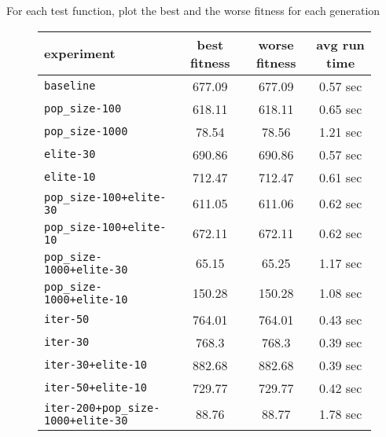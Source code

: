 For each test function, plot the best and the worse fitness for each generation

\begin{figure}[htb]
	\centering
	
	\begin{tabular}{lccc}
		\toprule
		\textbf{experiment} & \textbf{best fitness} & \textbf{worse fitness} & \textbf{avg run time} \\
		\midrule
		\texttt{baseline 						}	&  677.09 &                677.09 &                 0.57 sec \\
		\texttt{pop\_size-100 					}	&   618.11 &                618.11 &                 0.65 sec \\
		\texttt{pop\_size-1000 					}	&    78.54 &                 78.56 &                 1.21 sec \\
		\texttt{elite-30 						}	&  690.86 &                690.86 &                 0.57 sec \\
		\texttt{elite-10 						}	&  712.47 &                712.47 &                 0.61 sec \\
		\texttt{pop\_size-100+elite-30 			}	&   611.05 &                611.06 &                 0.62 sec \\
		\texttt{pop\_size-100+elite-10 			}	&   672.11 &                672.11 &                 0.62 sec \\
		\texttt{pop\_size-1000+elite-30 		}	&    65.15 &                 65.25 &                 1.17 sec \\
		\texttt{pop\_size-1000+elite-10 		}	&   150.28 &                150.28 &                 1.08 sec \\
		\texttt{iter-50 						}	&  764.01 &                764.01 &                 0.43 sec \\
		\texttt{iter-30 						}	&   768.3 &                 768.3 &                 0.39 sec \\
		\texttt{iter-30+elite-10 				}	&  882.68 &                882.68 &                 0.39 sec \\
		\texttt{iter-50+elite-10 				}	&  729.77 &                729.77 &                 0.42 sec \\
		\texttt{iter-200+pop\_size-1000+elite-30} 	&    88.76 &                 88.77 &                 1.78 sec \\\bottomrule
	\end{tabular}
	\label{tab:cmeas-performance-s}
\end{figure}

